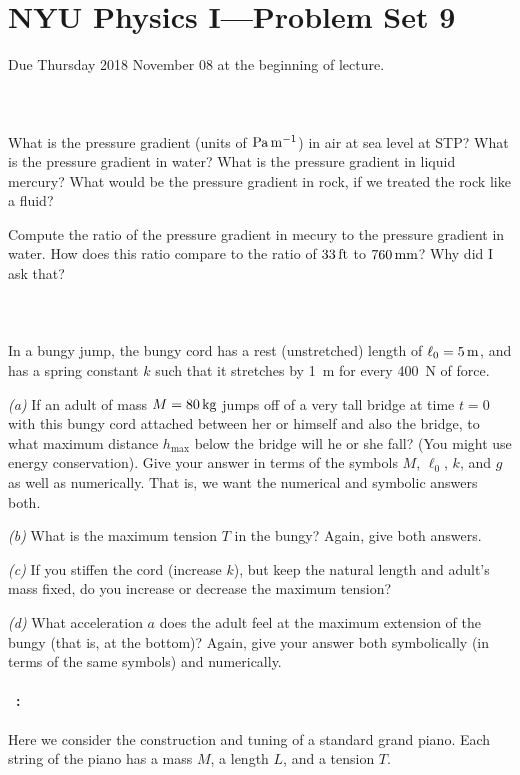 \documentclass[12pt]{article}
\begin{document}
\section*{NYU Physics I---Problem Set 9}

Due Thursday 2018 November 08 at the beginning of lecture.

\paragraph{\problemname~\theproblem}%
What is the pressure gradient (units of $\mathrm{Pa}\,\mathrm{m}^{-1}$) in air at sea level at STP?
What is the pressure gradient in water?
What is the pressure gradient in liquid mercury?
What would be the pressure gradient in rock, if we treated the rock like a fluid?

Compute the ratio of the pressure gradient in mecury to the pressure gradient
in water. How does this ratio compare to the ratio of $33\,\mathrm{ft}$ to $760\,\mathrm{mm}$?
Why did I ask that?

\paragraph{\problemname~\theproblem}%
In a bungy jump, the bungy cord has a rest (unstretched) length of
$\ell_0 = 5\,\mathrm{m}$, and has a spring constant $k$ such that it stretches
by 1~m for every 400~N of force.

\textsl{(a)} If an adult of mass $M=80\,\mathrm{kg}$ jumps off of a very tall
bridge at time $t=0$ with this bungy cord attached between her or
himself and also the bridge, to what maximum distance $h_\mathrm{max}$
below the bridge will he or she fall?  (You might use energy
conservation). Give your answer in terms of the symbols $M$, $\ell_0$,
$k$, and $g$ as well as numerically. That is, we want the numerical
and symbolic answers both.

\textsl{(b)} What is the maximum tension $T$ in the bungy? Again, give
both answers.

\textsl{(c)} If you stiffen the cord (increase $k$), but keep
the natural length and adult's mass fixed, do you increase or decrease the maximum
tension?

\textsl{(d)} What acceleration $a$ does the adult feel at the maximum
extension of the bungy (that is, at the bottom)? Again, give your
answer both symbolically (in terms of the same symbols) and numerically.

\paragraph{\problemname~\theproblem:}%
Here we consider the construction and tuning of a standard grand piano.
Each string of the piano has a mass $M$, a length $L$, and a tension $T$.
\end{document}
